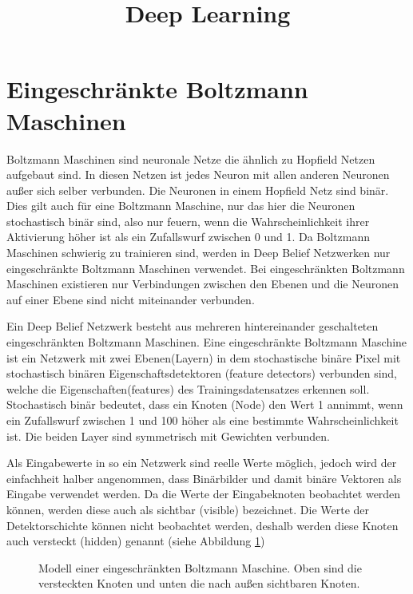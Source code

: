 \documentclass[12pt]{article}
\title{Deep Learning}
\begin{document}
	\maketitle

	\newpage

	\tableofcontents
	
	\newpage
	\section{Eingeschränkte Boltzmann Maschinen}
	Boltzmann Maschinen sind neuronale Netze die ähnlich zu Hopfield Netzen\cite{Hopfield} aufgebaut sind. In diesen Netzen ist jedes Neuron mit allen anderen Neuronen außer sich selber verbunden. Die Neuronen in einem Hopfield Netz sind binär. Dies gilt auch für eine Boltzmann Maschine, nur das hier die Neuronen stochastisch binär sind, also nur feuern, wenn die Wahrscheinlichkeit ihrer Aktivierung höher ist als ein Zufallswurf zwischen 0 und 1. Da Boltzmann Maschinen schwierig zu trainieren sind, werden in Deep Belief Netzwerken nur eingeschränkte Boltzmann Maschinen verwendet. Bei eingeschränkten Boltzmann Maschinen existieren nur Verbindungen zwischen den Ebenen und die Neuronen auf einer Ebene sind nicht miteinander verbunden.
	
	Ein Deep Belief Netzwerk besteht aus mehreren hintereinander geschalteten eingeschränkten Boltzmann Maschinen. Eine eingeschränkte Boltzmann Maschine ist ein Netzwerk mit zwei Ebenen(Layern) in dem stochastische binäre Pixel mit stochastisch binären Eigenschaftsdetektoren (feature detectors) verbunden sind, welche die Eigenschaften(features) des Trainingsdatensatzes erkennen soll. Stochastisch binär bedeutet, dass ein Knoten (Node) den Wert 1 annimmt, wenn ein Zufallswurf zwischen 1 und 100 höher als eine bestimmte Wahrscheinlichkeit ist. Die beiden Layer sind symmetrisch mit Gewichten verbunden.
	

Als Eingabewerte in so ein Netzwerk sind reelle Werte möglich, jedoch wird der einfachheit halber angenommen, dass Binärbilder und damit binäre Vektoren als Eingabe verwendet werden. Da die Werte der Eingabeknoten beobachtet werden können, werden diese auch als sichtbar (visible) bezeichnet. Die Werte der Detektorschichte können nicht beobachtet werden, deshalb werden diese Knoten auch versteckt (hidden) genannt (siehe Abbildung \ref{Boltzmann})

\begin{figure}[H]
	
	\caption{Modell einer eingeschränkten Boltzmann Maschine. Oben sind die versteckten Knoten und unten die nach außen sichtbaren Knoten.}
	\label{Boltzmann}
	\end{figure}
\end{document}
